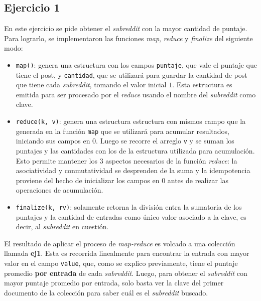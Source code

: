 \documentclass[a4paper]{article}
\begin{document}
\subsection{Ejercicio 1}
En este ejercicio se pide obtener el \textit{subreddit} con la mayor cantidad
de puntaje. Para lograrlo, se implementaron las funciones \textit{map},
\textit{reduce} y \textit{finalize} del siguiente modo:
\begin{itemize}
  \item \verb|map()|: genera una estructura con los campos \verb|puntaje|, que
  vale el puntaje que tiene el post, y \verb|cantidad|, que se utilizará para
  guardar la cantidad de post que tiene cada \textit{subreddit}, tomando el
  valor inicial $1$. Esta estructura es emitida para ser procesado por el
  \textit{reduce} usando el nombre del \textit{subreddit} como clave.
  \item \verb|reduce(k, v)|: genera una estructura estructura con mismos campo
  que la generada en la función \verb|map| que se utilizará para acumular
  resultados, iniciando sus campos en $0$. Luego se recorre el arreglo
  \verb|v| y se suman los puntajes y las cantidades con los de la estructura
  utilizada para acumulación. Esto permite mantener los 3 aspectos necesarios
  de la función \textit{reduce}: la asociatividad y conmutatividad se
  desprenden de la suma y la idempotencia proviene del hecho de inicializar los
  campos en $0$ antes de realizar las operaciones de acumulación.
  \item \verb|finalize(k, rv)|: solamente retorna la división entra la
  sumatoria de los puntajes y la cantidad de entradas como único valor asociado
  a la clave, es decir, al \textit{subreddit} en cuestión.
\end{itemize}

El resultado de aplicar el proceso de \textit{map-reduce} es volcado a una
colección llamada \textbf{ej1}. Esta es recorrida linealmente para encontrar la
entrada con mayor valor en el campo \verb|value|, que, como se explico
previamente, tiene el puntaje promedio \textbf{por entrada} de cada
\textit{subreddit}. Luego, para obtener el \textit{subreddit} con mayor puntaje
promedio por entrada, solo basta ver la clave del primer documento de la
colección para saber cuál es el \textit{subreddit} buscado.
\end{document}

